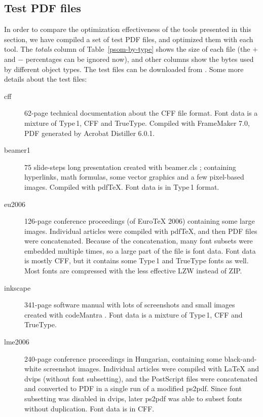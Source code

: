\documentclass{ltugproc}
\def\cmd{\textsf}
\def\pkg{\textsf}
\begin{document}
\subsection{Test PDF files}

In order to compare the optimization effectiveness of the tools presented in
this section, we have compiled a set of test PDF files, and optimized them
with each tool. The \emph{totals} column of Table~\ref{psom-by-type} shows
the size of each file (the $+$ and $-$ percentages can be ignored now), and
other columns show the bytes used by different object types. The test files
can be downloaded from \cite{example-pdfs}. Some more
details about the test files:

\begin{description}

\item[cff] 62-page technical documentation about the CFF file format. Font
data is a mixture of Type\,1, CFF and TrueType. Compiled with FrameMaker
7.0, PDF generated by Acrobat Distiller 6.0.1. 

\item[beamer1] 75 slide-steps long presentation created with
\pkg{beamer.cls} \cite{beamer}; containing hyperlinks, math formulas, some
vector graphics and a few pixel-based images. Compiled with pdf\TeX{}.
Font data is in Type\,1 format.

\item[eu2006] 126-page conference proceedings (of Euro\TeX{} 2006)
containing some large images. Individual articles were compiled with
pdf\TeX{}, and then PDF files were concatenated. Because of the
concatenation, many font subsets were embedded multiple times, so a large
part of the file is font data. Font data is mostly CFF, but it contains some
Type\,1 and TrueType fonts as well. Most fonts are compressed with the
less effective LZW instead of ZIP.

\item[inkscape] 341-page software manual with lots of screenshots and small
images created with codeMantra \cite{codemantra}. Font data is a mixture of
Type\,1, CFF and TrueType.

\item[lme2006] 240-page conference proceedings in Hungarian, containing some
black-and-white screenshot images. Individual articles were compiled with
\LaTeX{} and \cmd{dvips} (without font subsetting), and the PostScript files
were concatenated and converted to PDF in a single run of a modified
\cmd{ps2pdf}. Since font subsetting was disabled in \cmd{dvips}, later
\cmd{ps2pdf} was able to subset fonts without duplication. Font data is in
CFF.


\end{description}
\end{document}
